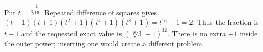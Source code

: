 Put $t=3^{\dfrac{1}{16}}$. Repeated difference of squares gives $(t-1)(t+1)(t^2+1)(t^4+1)(t^8+1)=t^{16}-1=2$. Thus the fraction is $t-1$ and the requested exact value is $\boxed{(\sqrt[16]3-1)^{32}}$. There is no extra $+1$ inside the outer power; inserting one would create a different problem.
